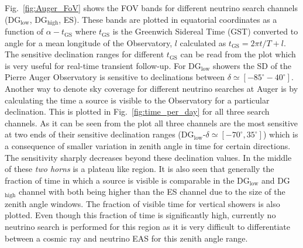 Fig.~\ref{fig:Auger_FoV} shows the FOV bands for different neutrino search channels (DG$\mathrm{_{\text{low}}}$, DG$\mathrm{_{\text{high}}}$, ES). These bands are plotted in equatorial coordinates as a function of $\alpha - t _{\text{GS}}$ where $t_{\text{GS}}$ is the Greenwich Sidereal Time (GST) converted to angle for a mean longitude of the Observatory, $l$ calculated as $t_{\text{GS}}= 2\pi t/T + l$. The sensitive declination ranges for different $t_{\text{GS}}$ can be read from the plot which is very useful for real-time transient follow-up. For DG$\mathrm{_{\text{low}}}$ showers the SD of the Pierre Auger Observatory is sensitive to declinations between $\delta \simeq [-85^{\circ} - 40^{\circ}]$. Another way to denote sky coverage for different neutrino searches at Auger is by calculating the time a source is visible to the Observatory for a particular declination. This is plotted in Fig.~\ref{fig:time_per_day} for all three search channels. As it can be seen from the plot all three channels are the most sensitive at two ends of their sensitive declination ranges (DG$\mathrm{_{\text{low}}}$-$\delta \simeq [-70^{\circ}, 35^{\circ}]$) which is a consequence of smaller variation in zenith angle in time for certain directions. The sensitivity sharply decreases beyond these declination values. In the middle of these \textit{two horns} is a plateau like region. It is also seen that generally the fraction of time in which a source is visible is comparable in the DG$\mathrm{_{\text{low}}}$ and DG$\mathrm{_{\text{high}}}$ channel with both being higher than the ES channel due to the size of the zenith angle windows. The fraction of visible time for vertical showers is also plotted. Even though this fraction of time is significantly high, currently no neutrino search is performed for this region as it is very difficult to differentiate between a cosmic ray and neutrino EAS for this zenith angle range.


